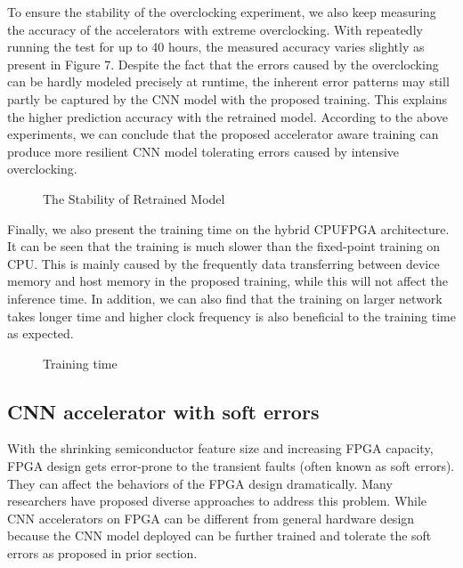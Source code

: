 To ensure the stability of the overclocking experiment, we 
also keep measuring the accuracy of the accelerators with extreme 
overclocking. With repeatedly running the test for up to 40 hours, 
the measured accuracy varies slightly as present in Figure 7. 
Despite the fact that the errors caused by the overclocking can be 
hardly modeled precisely at runtime, the inherent error patterns may 
still partly be captured by the CNN model with the proposed training. 
This explains the higher prediction accuracy with the retrained model. 
According to the above experiments, we can conclude that the proposed 
accelerator aware training can produce more resilient CNN model tolerating 
errors caused by intensive overclocking. 

\begin{figure}
        \caption{The Stability of Retrained Model}
        \label{fig:stability}
\end{figure}

  Finally, we also present the training time on the hybrid CPUFPGA architecture. 
It can be seen that the training is much slower than the fixed-point training on CPU. 
This is mainly caused by the frequently data transferring between device memory and host 
memory in the proposed training, while this will not affect the inference time. In addition, 
we can also find that the training on larger network takes longer time and higher clock frequency 
is also beneficial to the training time as expected. 

\begin{figure}
        \caption{Training time}
        \label{fig:time}
\end{figure}


\subsection{CNN accelerator with soft errors}
  With the shrinking semiconductor feature size and increasing FPGA capacity, 
FPGA design gets error-prone to the transient faults (often known as soft errors). 
They can affect the behaviors of the FPGA design dramatically. Many researchers \cite{Mansour_20,Karim_21,Nidhin_22,Subasi_23,ROSCH_24} 
have proposed diverse approaches to address this problem. While CNN accelerators on FPGA can be different 
from general hardware design because the CNN model deployed can be further trained and tolerate the 
soft errors as proposed in prior section\cite{Tu2018RANA_1}.


